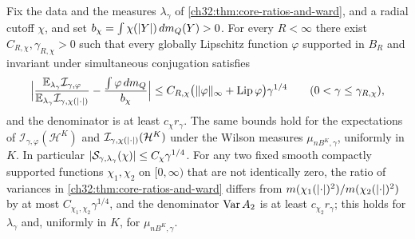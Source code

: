 \begin{theorem}\label{ch32:thm:core-ratio-rates}
Fix the data and the measures $\lambda_\gamma$ of \cref{ch32:thm:core-ratios-and-ward}, and a radial cutoff $\chi$, and set $b_\chi=\int\chi(\lvert Y\rvert)\,dm_Q(Y)>0$. For every $R<\infty$ there exist $C_{R,\chi},\gamma_{R,\chi}>0$ such that every globally Lipschitz function $\varphi$ supported in $B_R$ and invariant under simultaneous conjugation satisfies
\[
 \Bigl\lvert\frac{\mathbb E_{\lambda_\gamma}\mathcal I_{\gamma,\varphi}}{\mathbb E_{\lambda_\gamma}\mathcal I_{\gamma,\chi(\lvert \cdot\rvert)}}-\frac{\int\varphi\,dm_Q}{b_\chi}\Bigr\rvert\le C_{R,\chi}\bigl(\lVert \varphi\rVert_\infty+\operatorname{Lip}\varphi\bigr)\gamma^{1/4}\qquad(0<\gamma\le\gamma_{R,\chi}),
\]
and the denominator is at least $c_\chi r_\gamma$. The same bounds hold for the expectations of $\mathcal I_{\gamma,\varphi}(\mathcal H^K)$ and $\mathcal I_{\gamma,\chi(\lvert \cdot\rvert)}(\mathcal H^K)$ under the Wilson measures $\mu_{nB^K,\gamma}$, uniformly in $K$. In particular $\lvert \mathcal S_{\gamma,\lambda_\gamma}(\chi)\rvert\le C_\chi\gamma^{1/4}$. For any two fixed smooth compactly supported functions $\chi_1,\chi_2$ on $[0,\infty)$ that are not identically zero, the ratio of variances in \cref{ch32:thm:core-ratios-and-ward} differs from $m(\chi_1(\lvert \cdot\rvert)^2)/m(\chi_2(\lvert \cdot\rvert)^2)$ by at most $C_{\chi_1,\chi_2}\gamma^{1/4}$, and the denominator $\operatorname{Var} A_2$ is at least $c_{\chi_2}r_\gamma$; this holds for $\lambda_\gamma$ and, uniformly in $K$, for $\mu_{nB^K,\gamma}$.
\end{theorem}

